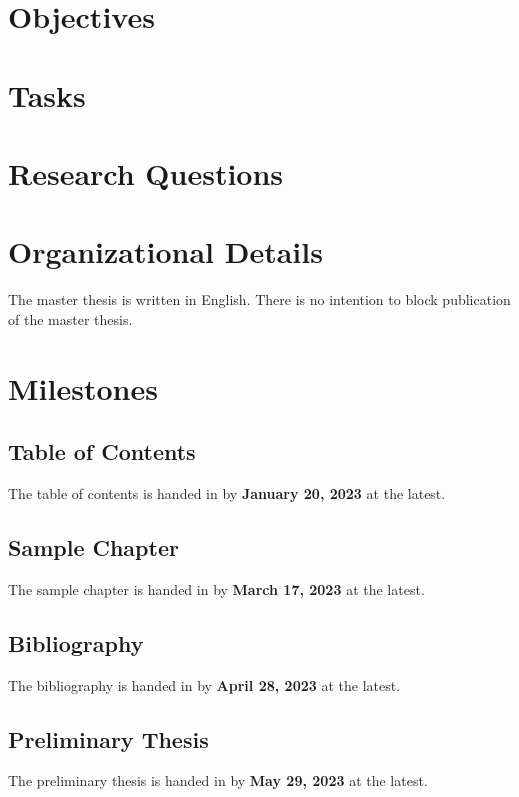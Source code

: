 \documentclass[english,notitlepage,smartquotes]{hgbreport}
\begin{document}
\section{Objectives} %

\section{Tasks}

\section{Research Questions}

\section{Organizational Details}

The master thesis is written in English.
There is no intention to block publication of the master thesis.

\section{Milestones}

\subsection{Table of Contents}

The table of contents is handed in by \textbf{January 20, 2023} at the latest.

\subsection{Sample Chapter}

The sample chapter is handed in by \textbf{March 17, 2023} at the latest.

\subsection{Bibliography}

The bibliography is handed in by \textbf{April 28, 2023} at the latest.

\subsection{Preliminary Thesis}

The preliminary thesis is handed in by \textbf{May 29, 2023} at the latest.
\end{document}
